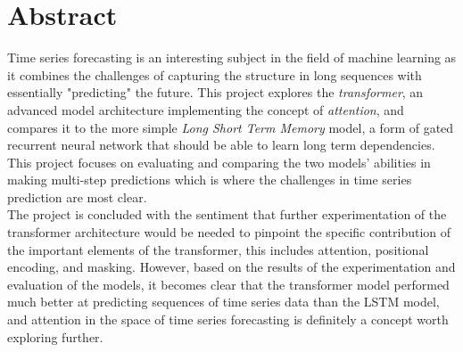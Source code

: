 \documentclass[main.tex]{subfiles}
\begin{document}
\section{Abstract}
Time series forecasting is an interesting subject in the field of machine learning as it combines the challenges of capturing the structure in long sequences with essentially "predicting" the future. This project explores the \textit{transformer}, an advanced model architecture implementing the concept of \textit{attention}, and compares it to the more simple \textit{Long Short Term Memory} model, a form of gated recurrent neural network that should be able to learn long term dependencies. This project focuses on evaluating and comparing the two models' abilities in making multi-step predictions which is where the challenges in time series prediction are most clear.\\
The project is concluded with the sentiment that further experimentation of the transformer architecture would be needed to pinpoint the specific contribution of the important elements of the transformer, this includes attention, positional encoding, and masking. However, based on the results of the experimentation and evaluation of the models, it becomes clear that the transformer model performed much better at predicting sequences of time series data than the LSTM model, and attention in the space of time series forecasting is definitely a concept worth exploring further. 
\end{document}
